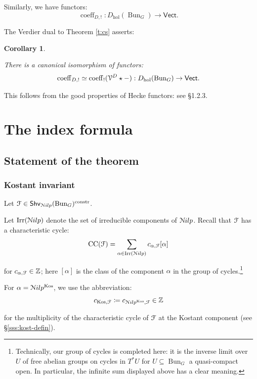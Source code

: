 \documentclass[reqno,11pt]{amsart}
\numberwithin{equation}{subsection}
\newtheorem{cor}[thm]{Corollary}
\theoremstyle{remark}
\newcommand{\bZ}{{\mathbb Z}}
\newcommand{\sF}{{\EuScript F}}
\newcommand{\sN}{{\EuScript N}}
\newcommand{\sV}{{\EuScript V}}
\newcommand{\on}{\operatorname}
\newcommand{\Vect}{\mathsf{Vect}}
\newcommand{\Bun}{\on{Bun}}
\renewcommand{\subset}{\subseteq}
\newcommand{\coeff}{\on{coeff}}
\newcommand{\Shv}{\mathsf{Shv}}
\newcommand{\Nilp}{\sN ilp}
\newcommand{\Kos}{\on{Kos}}
\newcommand{\constr}{\on{constr}}
\newcommand{\Irr}{\on{Irr}}
\newcommand{\hol}{\on{hol}}
\newcommand{\CC}{\on{CC}}
\begin{document}
\subsubsection{}

Similarly, we have functors:
%
\[
\coeff_{D,!}: D_{\hol}(\Bun_G) \to \Vect.
\]

The Verdier dual to Theorem \ref{t:cs} asserts:

\begin{cor}\label{c:cs-!}

There is a canonical isomorphism of functors:
%
\[
\coeff_{D,!} \simeq \coeff_!(\sV^D \star -): D_{\hol}(\Bun_G) \to \Vect.
\]

\end{cor}

This follows from the good properties of Hecke functors:
see \cite{agkrrv3} \S 1.2.3.
  
\section{The index formula}\label{s:index}

\subsection{Statement of the theorem}

\subsubsection{Kostant invariant}

Let $\sF \in \Shv_{\Nilp}(\Bun_G)^{\constr}$.

Let $\Irr(\Nilp)$ denote the set of irreducible components of
$\Nilp$. Recall that $\sF$ has a characteristic cycle:
%
\[
\CC(\sF) = \sum_{\alpha \in \Irr(\Nilp)} c_{\alpha,\sF}[\alpha]
\]

\noindent for $c_{\alpha,\sF} \in \bZ$; here $[\alpha]$ is the class
of the component $\alpha$ in the group of cycles.\footnote{Technically, our
group of cycles is completed here: it is the inverse limit over 
$U$ of free abelian groups
on cycles in $T^*U$ for $U \subset \Bun_G$ a quasi-compact open. In particular,
the infinite sum displayed above has a clear meaning.}

For $\alpha = \Nilp^{\Kos}$, we use the abbreviation: 
%
\[
c_{\Kos,\sF} \coloneqq c_{\Nilp^{\Kos},\sF} \in \bZ
\]

\noindent for the multiplicity of the characteristic cycle of $\sF$
at the Kostant component (see \S \ref{sss:kost-defin}).
\end{document}

